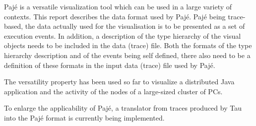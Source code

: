 
Pajé is a versatile visualization tool which can be used in a large
variety of contexts. This report describes the data format used by
Pajé. Pajé being trace-based, the data actually used for the
visualisation is to be presented as a set of execution events. In
addition, a description of the type hierarchy of the visual objects
needs to be included in the data (trace) file. Both the formats of the
type hierarchy description and of the events being self defined, there
also need to be a definition of these formats in the input data
(trace) file used by Pajé.

The versatility property has been used so far to visualize a
distributed Java application and the activity of the nodes of a
large-sized cluster of PCs. 

To enlarge the applicability of Pajé, a translator from traces
produced by Tau \cite{ShendeMCLBK:1998} into the Pajé format is
currently being implemented.


